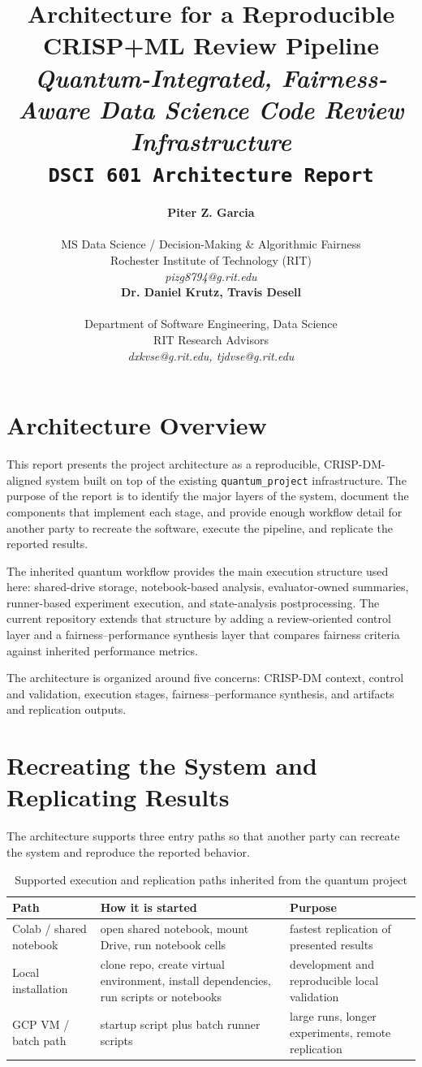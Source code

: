 \documentclass{IEEEtran}
\title{{\LARGE\textbf{Architecture for a Reproducible CRISP+ML Review Pipeline}}\\
{\Large\textit{Quantum-Integrated, Fairness-Aware Data Science Code Review Infrastructure}}\\
{\large\texttt{DSCI 601 Architecture Report}}}
\author{%
\begin{minipage}{0.48\textwidth}\begin{center}
{\bf Piter Z. Garcia}\\
\begin{small}
MS Data Science / Decision-Making \& Algorithmic Fairness\\
Rochester Institute of Technology (RIT)\\
{\it pizg8794@g.rit.edu}
\end{small}
\end{center}\end{minipage}
\hfill
\begin{minipage}{0.48\textwidth}\begin{center}
{\bf Dr. Daniel Krutz, Travis Desell}\\
\begin{small}
Department of Software Engineering, Data Science\\
RIT Research Advisors\\
{\it dxkvse@g.rit.edu, tjdvse@g.rit.edu}
\end{small}
\end{center}\end{minipage}%
}
\begin{document}
\maketitle

\section{Architecture Overview}

This report presents the project architecture as a reproducible,
CRISP-DM-aligned system built on top of the existing
\texttt{quantum\_project} infrastructure. The purpose of the report is to
identify the major layers of the system, document the components that implement
each stage, and provide enough workflow detail for another party to recreate the
software, execute the pipeline, and replicate the reported results.

The inherited quantum workflow provides the main execution structure used here:
shared-drive storage, notebook-based analysis, evaluator-owned summaries,
runner-based experiment execution, and state-analysis postprocessing. The
current repository extends that structure by adding a review-oriented control
layer and a fairness--performance synthesis layer that compares fairness
criteria against inherited performance metrics.

The architecture is organized around five concerns: CRISP-DM context, control
and validation, execution stages, fairness--performance synthesis, and artifacts
and replication outputs.

\section{Recreating the System and Replicating Results}

The architecture supports three entry paths so that another party can recreate
the system and reproduce the reported behavior.

\begin{table}[ht!]
\centering
\caption{Supported execution and replication paths inherited from the quantum project}
\label{tab:paths}
\begin{tabular}{p{1.8cm}p{2.8cm}p{2.7cm}}
\toprule
\textbf{Path} & \textbf{How it is started} & \textbf{Purpose} \\
\midrule
Colab / shared notebook & open shared notebook, mount Drive, run notebook cells & fastest replication of presented results \\
Local installation & clone repo, create virtual environment, install dependencies, run scripts or notebooks & development and reproducible local validation \\
GCP VM / batch path & startup script plus batch runner scripts & large runs, longer experiments, remote replication \\
\bottomrule
\end{tabular}
\end{table}
\end{document}
